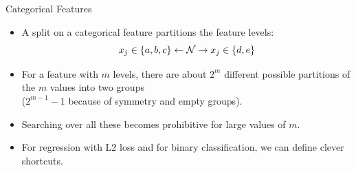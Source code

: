 \documentclass[11pt,compress,t,notes=noshow, xcolor=table]{beamer}
\begin{document}
  \begin{vbframe}{Categorical Features}
  \begin{itemize}
  \item A split on a categorical feature partitions the feature levels:
    $$x_j \in \{a,b,c\} \leftarrow \mathcal{N} \rightarrow x_j \in \{d,e\} $$
  \item For a feature with $m$ levels,
  there are about $2^m$ different possible partitions of the $m$ values into two groups\\ ($2^{m-1} - 1$ because of symmetry and empty groups).
  \item Searching over all these becomes prohibitive for large values of $m$.
  \item For regression with L2 loss and for binary classification, we can define clever shortcuts.
  \end{itemize}

  \end{vbframe}
\end{document}
